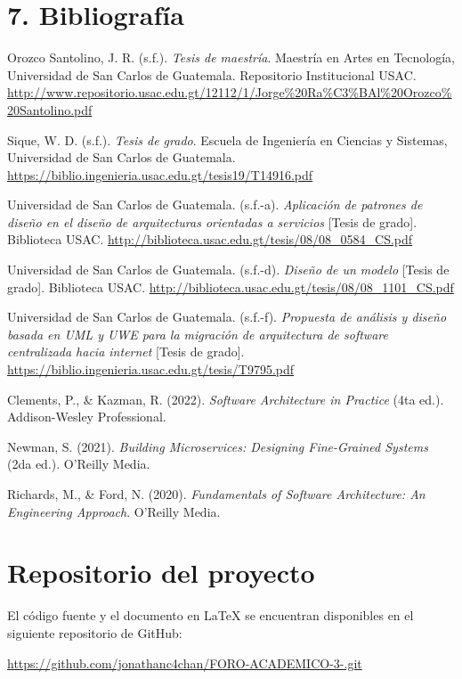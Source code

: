 \documentclass[12pt,letterpaper]{article}
\begin{document}
\section*{7. Bibliografía}

\vspace{4pt}
\hangindent=1cm \noindent Orozco Santolino, J. R. (s.f.). \textit{Tesis de maestría}. Maestría en Artes en Tecnología, Universidad de San Carlos de Guatemala. Repositorio Institucional USAC. \url{http://www.repositorio.usac.edu.gt/12112/1/Jorge%20Ra%C3%BAl%20Orozco%20Santolino.pdf}

\vspace{4pt}
\hangindent=1cm \noindent Sique, W. D. (s.f.). \textit{Tesis de grado}. Escuela de Ingeniería en Ciencias y Sistemas, Universidad de San Carlos de Guatemala. \url{https://biblio.ingenieria.usac.edu.gt/tesis19/T14916.pdf}

\vspace{4pt}
\hangindent=1cm \noindent Universidad de San Carlos de Guatemala. (s.f.-a). \textit{Aplicación de patrones de diseño en el diseño de arquitecturas orientadas a servicios} [Tesis de grado]. Biblioteca USAC. \url{http://biblioteca.usac.edu.gt/tesis/08/08_0584_CS.pdf}

\vspace{4pt}
\hangindent=1cm \noindent Universidad de San Carlos de Guatemala. (s.f.-d). \textit{Diseño de un modelo} [Tesis de grado]. Biblioteca USAC. \url{http://biblioteca.usac.edu.gt/tesis/08/08_1101_CS.pdf}

\vspace{4pt}
\hangindent=1cm \noindent Universidad de San Carlos de Guatemala. (s.f.-f). \textit{Propuesta de análisis y diseño basada en UML y UWE para la migración de arquitectura de software centralizada hacia internet} [Tesis de grado]. \url{https://biblio.ingenieria.usac.edu.gt/tesis/T9795.pdf}

\vspace{4pt}
\hangindent=1cm \noindent Clements, P., & Kazman, R. (2022). \textit{Software Architecture in Practice} (4ta ed.). Addison-Wesley Professional.

\vspace{4pt}
\hangindent=1cm \noindent Newman, S. (2021). \textit{Building Microservices: Designing Fine-Grained Systems} (2da ed.). O'Reilly Media.

\vspace{4pt}
\hangindent=1cm \noindent Richards, M., & Ford, N. (2020). \textit{Fundamentals of Software Architecture: An Engineering Approach}. O'Reilly Media.

\section*{Repositorio del proyecto}

El código fuente y el documento en \LaTeX{} se encuentran disponibles en el siguiente repositorio de GitHub:

\url{https://github.com/jonathanc4chan/FORO-ACADEMICO-3-.git}
\end{document}
